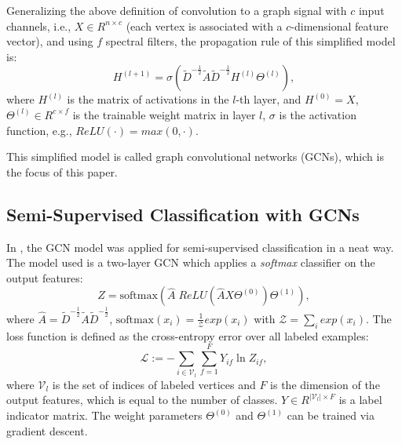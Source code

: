 \documentclass[letterpaper]{article} \usepackage{aaai18}  \usepackage{times}  \usepackage{helvet}  \usepackage{courier}  \usepackage{url}  \usepackage{graphicx}  \usepackage{algorithm}
\begin{document}
Generalizing the above definition of convolution to a graph signal with $c$ input channels, i.e., $X \in R^{n \times c}$ (each vertex is associated with a $c$-dimensional feature vector), and using $f$ spectral filters, the propagation rule of this simplified model is:
\begin{equation}
\label{eq:convolution}
H^{(l+1)}= \sigma \left(
    \tilde{D}^{-\frac{1}{2}}\tilde{A}\tilde{D}^{-\frac{1}{2}} H^{(l)}\Theta^{(l)}
    \right),
\end{equation}
where $H^{(l)}$ is the matrix of activations in the $l$-th layer, and $H^{(0)} = X$, $\Theta^{(l)}\in R^{c \times f}$ is the trainable weight matrix in layer $l$, $\sigma$ is the activation function, e.g., $ReLU(\cdot) = max(0, \cdot)$.

This simplified model is called graph convolutional networks (GCNs), which is the focus of this paper.





\subsection{Semi-Supervised Classification with GCNs}





In \cite{kipf2016semi}, the GCN model was applied for semi-supervised classification in a neat way. The model used is a two-layer GCN which applies a \emph{softmax} classifier on the output features:
\begin{equation}
\label{eq:kipfGCN}
Z = \text{softmax}\left (
    \hat{A}\; ReLU\left(
    \hat{A}X\Theta^{(0)}
    \right)\Theta^{(1)}
\right),
\end{equation}
where $\hat{A}=\tilde{D}^{-\frac{1}{2}}\tilde{A}\tilde{D}^{-\frac{1}{2}}$, $\text{softmax}(x_i) = \frac{1}{\mathcal{Z}} exp(x_i)$ with $\mathcal{Z} = \sum_i exp(x_i)$. The loss function is defined as the cross-entropy error over all labeled examples:
\begin{equation}
\label{eq:loss}
\mathcal{L} :=  -\sum_{i\in \mathcal{V}_l} \sum_{f=1}^F Y_{if} \ln Z_{if},
\end{equation}
where $\mathcal{V}_l$ is the set of indices of labeled vertices and $F$ is the dimension of the output features, which is equal to the number of classes. $Y\in R^{|\mathcal{V}_l|\times F}$ is a label indicator matrix. The weight parameters $\Theta^{(0)}$ and $\Theta^{(1)}$ can be trained via gradient descent.
\end{document}
